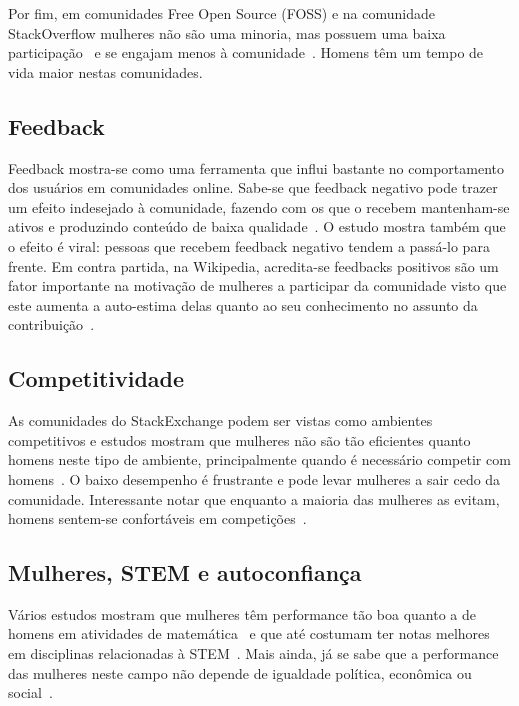 Por fim, em comunidades Free Open Source (FOSS) e na comunidade StackOverflow mulheres não são uma minoria, mas possuem uma baixa participação~\cite{rustad2011suck} e se engajam menos à comunidade~\cite{Vasilescu27092013}. Homens têm um tempo de vida maior nestas comunidades.

\subsection{Feedback}

Feedback mostra-se como uma ferramenta que influi bastante no comportamento dos usuários em comunidades online. Sabe-se que feedback negativo pode trazer um efeito indesejado à comunidade, fazendo com os que o recebem mantenham-se ativos e produzindo conteúdo de baixa qualidade~\cite{cheng2014community}. O estudo mostra também que o efeito é viral: pessoas que recebem feedback negativo tendem a passá-lo para frente. Em contra partida, na Wikipedia, acredita-se feedbacks positivos são um fator importante na motivação de mulheres a participar da comunidade visto que este aumenta a auto-estima delas quanto ao seu conhecimento no assunto da contribuição~\cite{collier2012conflict}.

\subsection{Competitividade}

As comunidades do StackExchange podem ser vistas como ambientes competitivos e estudos mostram que mulheres não são tão eficientes quanto homens neste tipo de ambiente, principalmente quando é necessário competir com homens~\cite{gneezy2003performance}. O baixo desempenho é frustrante e pode levar mulheres a sair cedo da comunidade. Interessante notar que enquanto a maioria das mulheres as evitam, homens sentem-se confortáveis em competições~\cite{niederle2005women,croson2009gender}.

\subsection{Mulheres, STEM e autoconfiança}
Vários estudos mostram que mulheres têm performance tão boa quanto a de homens em atividades de matemática~\cite{hyde1990gender,campbell1986effects} e que até costumam ter notas melhores em disciplinas relacionadas à STEM~\cite{stoet2015sex}. Mais ainda, já se sabe que a performance das mulheres neste campo não depende de igualdade política, econômica ou social~\cite{stoet2015sex}. 


